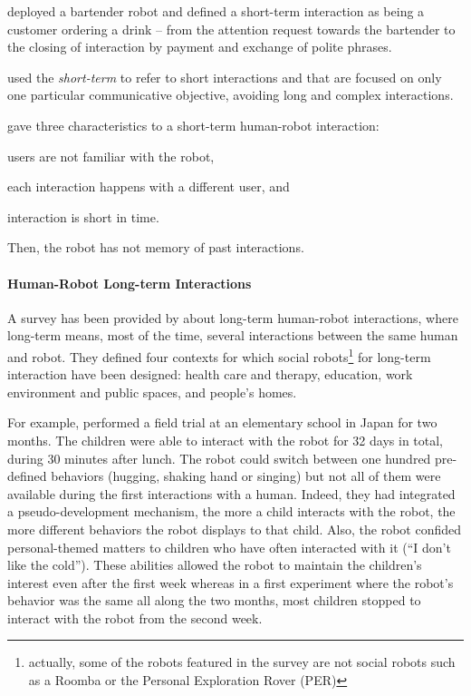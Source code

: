 \documentclass[a4paper,11pt,twoside]{StyleThese}
\begin{document}
\cite{gaschler_2012_modelling} deployed a bartender robot and defined a short-term interaction as being a customer ordering a drink – from the attention request towards the bartender to the closing of interaction by payment and exchange of polite phrases.

\cite{iocchi_2015_personalized} used the \emph{short-term} to refer to short interactions and that are focused on only one particular communicative objective, avoiding long and complex interactions.

\cite{sanelli_2017_short} gave three characteristics to a short-term human-robot interaction: 
\begin{inlineEnumerate}
	\item users are not familiar with the robot,
	\item each interaction happens with a different user, and
	\item interaction is short in time.
\end{inlineEnumerate} Then, the robot has not memory of past interactions.

\paragraph{Human-Robot Long-term Interactions}
A survey has been provided by \cite{leite_2013_social} about long-term human-robot interactions, where long-term means, most of the time, several interactions between the same human and robot. They defined four contexts for which social robots\footnote{actually, some of the robots featured in the survey are not social robots such as a Roomba or the Personal Exploration Rover (PER)} for long-term interaction have been designed: health care and therapy, education, work environment and public spaces, and people's homes. 

For example, \cite{kanda_2007_two} performed a field trial at an elementary school in Japan for two months. The children were able to interact with the robot for 32 days in total, during 30 minutes after lunch. The robot could switch between one hundred pre-defined behaviors (\eg hugging, shaking hand or singing) but not all of them were available during the first interactions with a human. Indeed, they had integrated a pseudo-development mechanism, \ie the more a child interacts with the robot, the more different behaviors the robot displays to that child. Also, the robot confided personal-themed matters to children who have often interacted with it (\eg ``I don't like the cold''). These abilities allowed the robot to maintain the children's interest even after the first week whereas in a first experiment where the robot's behavior was the same all along the two months, most children stopped to interact with the robot from the second week. 
\end{document}
